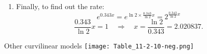 \begin{frame}

\begin{enumerate}
\item[] Finally, to find out the rate:
\vfill
\[
e^{0.343 x} = e^{\ln 2 \times  \frac{0.343}{\ln 2} x} = 2^{ \frac{0.343}{\ln 2}x}
\]
\vfill
\[
\frac{0.343}{\ln 2} x = 1 \quad \Longrightarrow \quad x =  \frac{\ln 2}{0.343} = 2.020837.
\]
\myEnd

\end{enumerate}
\end{frame}
\begin{frame}{Other curvilinear models}
\centering
\texttt{[image: Table\_11-2-10-neg.png]}
\end{frame}
